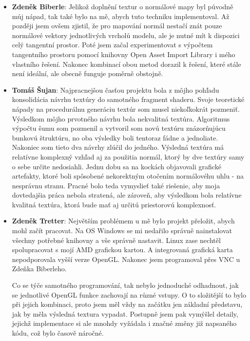\documentclass[12pt,a4paper,titlepage,final]{report}
\newcommand\AuthorA{Zdeněk Biberle}
\newcommand\AuthorB{Tomáš Šujan}
\newcommand\AuthorC{Zdeněk Tretter}
\begin{document}
\begin{itemize}
\item \textbf{\AuthorA}: Jelikož doplnění textur o normálové mapy byl původně můj nápad, tak také bylo na mě, abych tuto techniku implementoval. Až později jsem ovšem zjistil, že pro mapování normál nestačí znát pouze normálové vektory jednotlivých vrcholů modelu, ale je nutné mít k dispozici celý tangentní prostor. Poté jsem začal experimentovat s výpočtem tangentního prostoru pomocí knihovny Open Asset Import Library i mého vlastního řešení. Nakonec kombinací obou metod dorazil k řešení, které stále není ideální, ale obecně funguje poměrně obstojně.
\item \textbf{\AuthorB}: Najpracnejšou časťou projektu bola z môjho pohľadu konsolidácia návrhu textúry do samotného fragment shaderu. Svoje teoretické nápady na procedurálnu generáciu textúr som musel niekoľkokrát pozmeniť. Výsledkom môjho prvotného návrhu bola nekvalitná textúra.  Algoritmus výpočtu šumu som pozmenil a vytvoril som novú textúru znázorňujúcu bunkovú štruktúru, no oba výsledky boli tentoraz fádne a jednoliate. Nakoniec som tieto dva návrhy zlúčil do jedného. Výsledná textúra má relatívne komplexný vzhľad aj za použitia normál, ktorý by dve textúry samy o sebe určite nedosiahli. Jednu dobu sa na kockách objavovali grafické artefakty, ktoré boli spôsobené nekorektným otočením normálovéhu uhlu - na nesprávnu stranu. Pracné bolo teda vymyslieť také riešenie, aby moja dovtedajšia práca nebola stratená, ale zároveň, aby výsledkom bola relatívne kvalitná textúra, ktorá bude mať aj určitú priestorovú komplexnosť.
\item \textbf{\AuthorC}: Největším problémem u mě bylo projekt přeložit, abych mohl začít pracovat. Na OS Windows se mi nedařilo správně nainstalovat všechny potřebné knihovny a vše správně nastavit. Linux zase nechtěl spolupracovat s mojí AMD grafickou kartou. A integrovaná grafická karta nepodporovala vyšší verze OpenGL. Nakonec jsem programoval přes VNC u Zdeňka Biberleho. 

Co se týče samotného programování, tak nebylo jednoduché odhadnout, jak se jednotlivé OpenGL funkce zachovají na různé vstupy. O to složitější to bylo při jejich kombinaci, proto jsem měl vždy na začátku jen základní představu, jak by měla výsledná textura vypadat. Postupně jsem pak vymýšlel detaily, jejichž implementace si ale mnohdy vyžádala i značné změny již napsaného kódu, což bylo časově náročné. 

\end{itemize}
\end{document}
